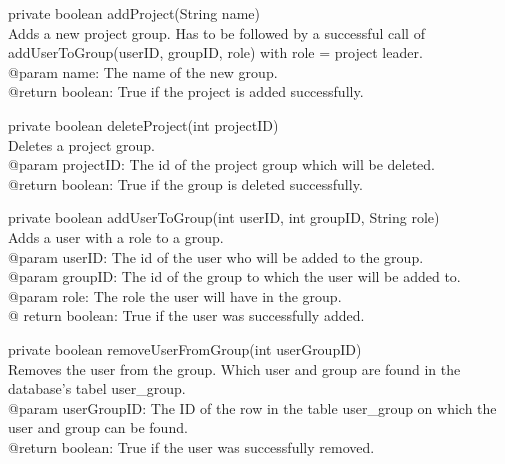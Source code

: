 \documentclass[a4paper]{article}
\begin{document}
\vspace{5mm}
\begin{hangparas}{1.5em}{1}
private boolean addProject(String name)\\
Adds a new project group. Has to be followed by a successful call of addUserToGroup(userID, groupID, role) with role = project leader.\\
@param name: The name of the new group.\\
@return boolean: True if the project is added successfully.
\end{hangparas}

\vspace{5mm}
\begin{hangparas}{1.5em}{1}
private boolean deleteProject(int projectID)\\
Deletes a project group.\\
@param projectID: The id of the project group which will be deleted.\\
@return boolean: True if the group is deleted successfully.
\end{hangparas}

\vspace{5mm}
\begin{hangparas}{1.5em}{1}
private boolean addUserToGroup(int userID, int groupID, String role)\\
Adds a user with a role to a group.\\
@param userID: The id of the user who will be added to the group.\\
@param groupID: The id of the group to which the user will be added to.\\
@param role: The role the user will have in the group.\\
@ return boolean: True if the user was successfully added.
\end{hangparas}

\vspace{5mm}
\begin{hangparas}{1.5em}{1}
private boolean removeUserFromGroup(int userGroupID)\\
Removes the user from the group. Which user and group are found in the database's tabel user\_group.\\
@param userGroupID: The ID of the row in the table user\_group on which the user and group can be found.\\
@return boolean: True if the user was successfully removed.\\
\end{hangparas}
\end{document}
